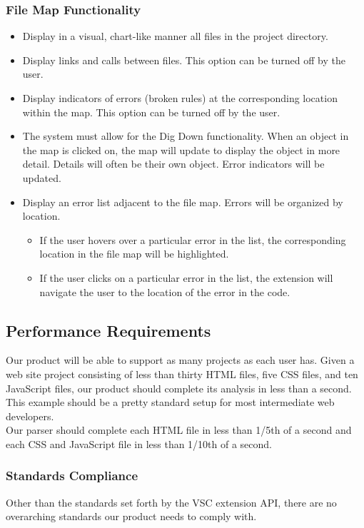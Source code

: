 \documentclass[letterpaper,10pt,titlepage,draftclsnofoot,onecolumn,onesided] {IEEEtran}
\begin{document}
\subsubsection{File Map Functionality}
\begin{itemize}
	\item Display in a visual, chart-like manner all files in the project directory.
    \item Display links and calls between files. This option can be turned off by the user.
    \item Display indicators of errors (broken rules) at the corresponding location within the map. This option can be turned off by the user.
    \item The system must allow for the Dig Down functionality. When an object in the map is clicked on, the map will update to display the object in more detail. Details will often be their own object. Error indicators will be updated.
    \item Display an error list adjacent to the file map. Errors will be organized by location.
    \begin{itemize}
    	\item If the user hovers over a particular error in the list, the corresponding location in the file map will be 	highlighted.
        \item If the user clicks on a particular error in the list, the extension will navigate the user to the location of the error in the code.
    \end{itemize}
\end{itemize}

\subsection{Performance Requirements}
Our product will be able to support as many projects as each user has. 
Given a web site project consisting of less than thirty HTML files, five CSS files, and ten JavaScript files, our product should complete its analysis in less than a second. 
This example should be a pretty standard setup for most intermediate web developers.
\\
Our parser should complete each HTML file in less than 1/5th of a second and each CSS and JavaScript file in less than 1/10th of a second.

\subsubsection{Standards Compliance}
Other than the standards set forth by the VSC extension API, there are no overarching standards our product needs to comply with.
\end{document}
